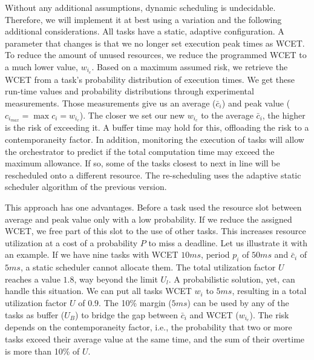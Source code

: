 \documentclass[]{scrartcl}
\begin{document}
Without any additional assumptions, dynamic scheduling is undecidable. %
Therefore, we will implement it at best using a variation and the following additional considerations.
All tasks have a static, adaptive configuration.
A parameter that changes is that we no longer set execution peak times as WCET. 
To reduce the amount of unused resources, we reduce the programmed WCET to a much lower value, $w_{i_c}$.
Based on a maximum assumed risk, we retrieve the WCET from a task's probability distribution of execution times.
We get these run-time values and probability distributions through experimental measurements. 
Those measurements give us an average ($\bar c_i$) and peak value ($c_{i_{max}} = \max c_i = w_{i_c} $). 
The closer we set our new $w_{i_c}$ to the average $\bar c_i$, the higher is the risk of exceeding it.
A buffer time may hold for this, offloading the risk to a contemporaneity factor.
In addition, monitoring the execution of tasks will allow the orchestrator to predict if the total computation time may exceed the maximum allowance.
If so, some of the tasks closest to next in line will be rescheduled onto a different resource.
The re-scheduling uses the adaptive static scheduler algorithm of the previous version.

This approach has one advantages. 
Before a task used the resource slot between average and peak value only with a low probability.
If we reduce the assigned WCET, we free part of this slot to the use of other tasks.
This increases resource utilization at a cost of a probability $P$ to miss a deadline.
Let us illustrate it with an example.
If we have nine tasks with WCET $10ms$, period $p_i$ of $50ms$ and $\bar c_i$ of $5ms$, a static scheduler cannot allocate them. 
The total utilization factor $U$ reaches a value $1.8$, way beyond the limit $U_l$.
A probabilistic solution, yet, can handle this situation. 
We can put all tasks WCET $w_i$ to $5ms$, resulting in a total utilization factor $U$ of $0.9$.
The 10\% margin ($5ms$) can be used by any of the tasks as buffer ($U_B$) to bridge the gap between $\bar c_i$ and WCET ($w_{i_c}$).
The risk depends on the contemporaneity factor, i.e., the probability that two or more tasks exceed their average value at the same time, and the sum of their overtime is more than 10\% of $U$.
\end{document}
